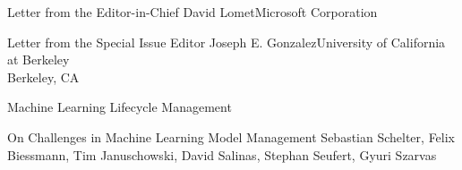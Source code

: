 \documentclass[11pt]{article}
\begin{document}


\begin{bulletin}

%
%

\begin{lettersection}


\begin{letter}{Letter from the Editor-in-Chief}
{David Lomet}{Microsoft Corporation}

\end{letter}
%
\newpage
%
%

\begin{letter}{Letter from the Special Issue Editor}
{Joseph E. Gonzalez}{University of California at Berkeley\\ Berkeley, CA}
\graphicspath{{letters/}}

\end{letter}

\end{lettersection}



\begin{articlesection}{Machine Learning Lifecycle Management}
%
%
%
\begin{article}
{On Challenges in Machine Learning Model Management}
{Sebastian Schelter, Felix Biessmann, Tim Januschowski, David Salinas, Stephan Seufert, Gyuri Szarvas}
\graphicspath{{submissions/AmazonModelManagement/figs/}}

\end{article}



\end{articlesection}
\end{bulletin}
\end{document}

